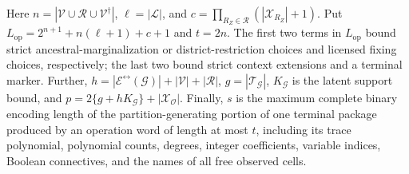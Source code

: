 Here \(n=|\mathcal V\cup\mathcal R\cup\mathcal V^{\dagger}|\), \(\ell=|\mathcal L|\), and \(c=\prod_{R_Z\in\mathcal R}(|\mathcal X_{R_Z}|+1)\). Put \(L_{\mathrm{op}}=2^{n+1}+n(\ell+1)+c+1\) and \(t=2n\). The first two terms in \(L_{\mathrm{op}}\) bound strict ancestral-marginalization or district-restriction choices and licensed fixing choices, respectively; the last two bound strict context extensions and a terminal marker. Further, \(h=|\mathcal E^{\leftrightarrow}(\mathcal G)|+|\mathcal V|+|\mathcal R|\), \(g=|\mathcal T_{\mathcal G}|\), \(K_{\mathcal G}\) is the latent support bound, and \(p=2\{g+hK_{\mathcal G}\}+|\mathcal X_{\mathcal O}|\). Finally, \(s\) is the maximum complete binary encoding length of the partition-generating portion of one terminal package produced by an operation word of length at most \(t\), including its trace polynomial, polynomial counts, degrees, integer coefficients, variable indices, Boolean connectives, and the names of all free observed cells.